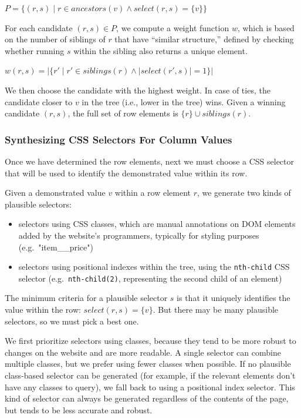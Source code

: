 \documentclass[sigconf,screen]{acmart}
\providecommand{\tightlist}{%
  \setlength{\itemsep}{0pt}\setlength{\parskip}{0pt}}
\begin{document}
\(P = \{ (r, s) \mid r \in ancestors(v) \land select(r, s) = \{v\} \}\)

For each candidate \((r, s) \in P\), we compute a weight function \(w\),
which is based on the number of siblings of \(r\) that have ``similar
structure,'' defined by checking whether running \(s\) within the
sibling also returns a unique element.

\(w(r, s) = |\{ r' \mid r' \in siblings(r) \land |select(r', s) | = 1 \}|\)

We then choose the candidate with the highest weight. In case of ties,
the candidate closer to \(v\) in the tree (i.e., lower in the tree)
wins. Given a winning candidate \((r, s)\), the full set of row elements
is \(\{r\} \cup siblings(r)\).

\hypertarget{synthesizing-css-selectors-for-column-values}{%
\subsubsection{Synthesizing CSS Selectors For Column
Values}\label{synthesizing-css-selectors-for-column-values}}

Once we have determined the row elements, next we must choose a CSS
selector that will be used to identify the demonstrated value within its
row.

Given a demonstrated value \(v\) within a row element \(r\), we generate
two kinds of plausible selectors:

\begin{itemize}
\tightlist
\item
  selectors using CSS classes, which are manual annotations on DOM
  elements added by the website's programmers, typically for styling
  purposes (e.g.~"item\_\_price")
\item
  selectors using positional indexes within the tree, using the
  \texttt{nth-child} CSS selector (e.g.~\texttt{nth-child(2)},
  representing the second child of an element)
\end{itemize}

The minimum criteria for a plausible selector \(s\) is that it uniquely
identifies the value within the row: \(select(r, s) = \{v\}\). But there
may be many plausible selectors, so we must pick a best one.

We first prioritize selectors using classes, because they tend to be
more robust to changes on the website and are more readable. A single
selector can combine multiple classes, but we prefer using fewer classes
when possible. If no plausible class-based selector can be generated
(for example, if the relevant elements don't have any classes to query),
we fall back to using a positional index selector. This kind of selector
can always be generated regardless of the contents of the page, but
tends to be less accurate and robust.
\end{document}
